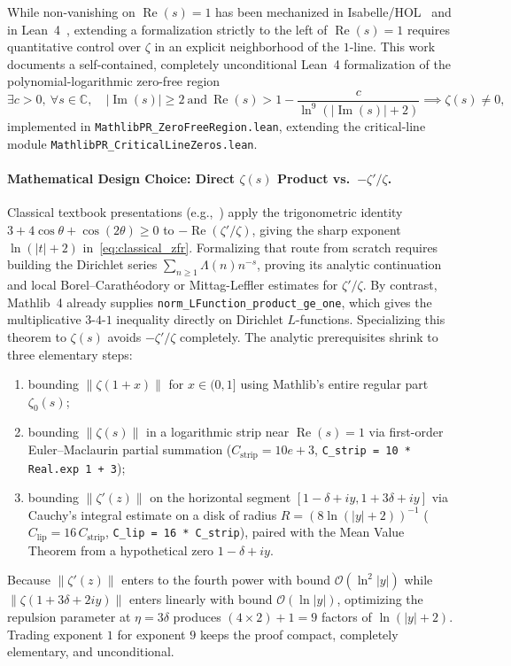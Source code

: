 \documentclass[11pt,a4paper]{article}
\theoremstyle{definition}
\newcommand{\Cfield}{\mathbb{C}}
\begin{document}
While non-vanishing on $\operatorname{Re}(s) = 1$ has been mechanized in Isabelle/HOL~\cite{eberl2019} and in Lean~4~\cite{pnt2024}, extending a formalization strictly to the left of $\operatorname{Re}(s) = 1$ requires quantitative control over $\zeta$ in an explicit neighborhood of the $1$-line. This work documents a self-contained, completely unconditional Lean~4 formalization of the polynomial-logarithmic zero-free region
\begin{equation}\label{eq:formal_zfr}
\exists c > 0,\ \forall s \in \Cfield, \quad |{\operatorname{Im}}(s)| \ge 2 \ \text{and}\ \operatorname{Re}(s) > 1 - \frac{c}{\ln^9(|\operatorname{Im}(s)|+2)} \implies \zeta(s) \ne 0,
\end{equation}
implemented in \texttt{MathlibPR\_\allowbreak ZeroFreeRegion.lean}, extending the critical-line module \texttt{MathlibPR\_\allowbreak CriticalLineZeros.lean}.

\paragraph{Mathematical Design Choice: Direct $\zeta(s)$ Product vs.\ $-\zeta'/\zeta$.}
Classical textbook presentations (e.g.,~\cite{titchmarsh1986}) apply the trigonometric identity $3 + 4\cos\theta + \cos(2\theta) \ge 0$ to $-\operatorname{Re}(\zeta'/\zeta)$, giving the sharp exponent $\ln(|t|+2)$ in~\eqref{eq:classical_zfr}. Formalizing that route from scratch requires building the Dirichlet series $\sum_{n \ge 1} \Lambda(n) n^{-s}$, proving its analytic continuation and local Borel--Carath{\'e}odory or Mittag-Leffler estimates for $\zeta'/\zeta$. By contrast, Mathlib~4 already supplies \texttt{norm\_LFunction\_product\_ge\_one}, which gives the multiplicative $3$-$4$-$1$ inequality directly on Dirichlet $L$-functions. Specializing this theorem to $\zeta(s)$ avoids $-\zeta'/\zeta$ completely. The analytic prerequisites shrink to three elementary steps:
\begin{enumerate}[noitemsep]
\item bounding $\|\zeta(1+x)\|$ for $x \in (0,1]$ using Mathlib's entire regular part $\zeta_0(s)$;
\item bounding $\|\zeta(s)\|$ in a logarithmic strip near $\operatorname{Re}(s)=1$ via first-order Euler--Maclaurin partial summation ($C_{\text{strip}} = 10e + 3$, \texttt{C\_strip = 10 * Real.exp 1 + 3});
\item bounding $\|\zeta'(z)\|$ on the horizontal segment $[1-\delta+iy, 1+3\delta+iy]$ via Cauchy's integral estimate on a disk of radius $R = (8\ln(|y|+2))^{-1}$ ($C_{\text{lip}} = 16\,C_{\text{strip}}$, \texttt{C\_lip = 16 * C\_strip}), paired with the Mean Value Theorem from a hypothetical zero $1 - \delta + iy$.
\end{enumerate}
Because $\|\zeta'(z)\|$ enters to the fourth power with bound $\mathcal{O}(\ln^2|y|)$ while $\|\zeta(1+3\delta+2iy)\|$ enters linearly with bound $\mathcal{O}(\ln|y|)$, optimizing the repulsion parameter at $\eta = 3\delta$ produces $(4 \times 2) + 1 = 9$ factors of $\ln(|y|+2)$. Trading exponent $1$ for exponent $9$ keeps the proof compact, completely elementary, and unconditional.
\end{document}
